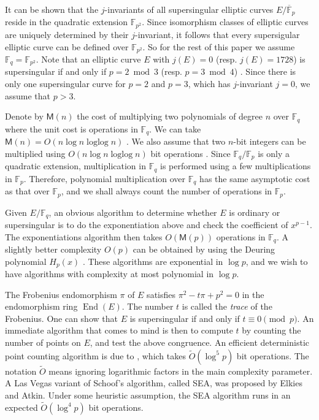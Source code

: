 \documentclass[12pt]{article}
\theoremstyle{plain}
\theoremstyle{definition}
\newcommand{\tildO}{\tilde{O}}
\DeclareMathOperator{\ringofend}{End} %
\DeclareMathOperator{\loglog}{loglog}
\def\F{\ensuremath{\mathbb{F}}}
\def\MM{\ensuremath{\mathsf{M}}}
\begin{document}
It can be shown that the $j$-invariants of all supersingular elliptic curves $E / \overline{\F}_p$ 
reside in the quadratic extension $\F_{p^2}$. Since isomorphism classes of elliptic curves are 
uniquely determined by their $j$-invariant, it follows that every supersigular elliptic curve can 
be defined over $\F_{p^2}$. So for the rest of this paper we assume $\F_q = \F_{p^2}$. Note that 
an elliptic curve $E$ with $j(E) = 0$ (resp. $j(E) = 1728$) is supersingular if and only if $p = 2 
\bmod 3$ (resp. $p = 3 \bmod 4$) \cite[Theorem 4.1.c]{silverman2009arithmetic}. Since there is only 
one supersingular curve for $p = 2$ and $p = 3$, which has $j$-invariant $j = 0$, we assume that $p 
> 3$. 

Denote by $\MM(n)$ the cost of multiplying two polynomials of degree $n$ over $\F_q$ where the unit 
cost is operations in $\F_q$. We can take $\MM(n) = O(n\log n \loglog n)$ \cite{vzGG}. We also 
assume that two $n$-bit integers can be multiplied using $O(n\log n \loglog n)$ bit operations 
\cite{vzGG}. Since $\F_q / \F_p$ is only a quadratic extension, multiplication in $\F_q$ is 
performed using a few multiplications in $\F_p$. Therefore, polynomial multiplication over $\F_q$ 
has the same asymptotic cost as that over $\F_p$, and we shall always count the number of 
operations in $\F_p$.

Given $E / \F_q$, an obvious algorithm to determine whether $E$ is ordinary or supersingular is to 
do the exponentiation above and check the coefficient of $x^{p - 1}$. The exponentiations algorithm 
then takes $O(\MM(p))$ operations in $\F_q$. A slightly better complexity $O(p)$ can be obtained by 
using the Deuring polynomial $H_p(x)$ \cite[Theorem 4.1.b]{silverman2009arithmetic}. These 
algorithms are exponential in $\log p$, and we wish to have algorithms with complexity at most 
polynomial in $\log p$.

The Frobenius endomorphism $\pi$ of $E$ satisfies $\pi^2 - t\pi + p^2 = 0$ in the endomorphism ring 
$\ringofend(E)$. The number $t$ is called the \textit{trace} of the Frobenius. One can show that 
$E$ is supersingular if and only if $t \equiv 0 \pmod{p}$. An immediate algorithm that comes to 
mind is then to compute $t$ by counting the number of points on $E$, and test the above congruence. 
An efficient deterministic point counting algorithm is due to \cite{schoof85}, which takes 
$\tildO(\log^5 p)$ bit operations. The notation $\tildO$ means ignoring logarithmic factors in the 
main complexity parameter. A Las Vegas variant of Schoof's algorithm, called SEA, was proposed by 
Elkies and Atkin. Under some heuristic assumption, the SEA algorithm runs in an expected 
$\tildO(\log^4p)$ bit operations.  
\end{document}
